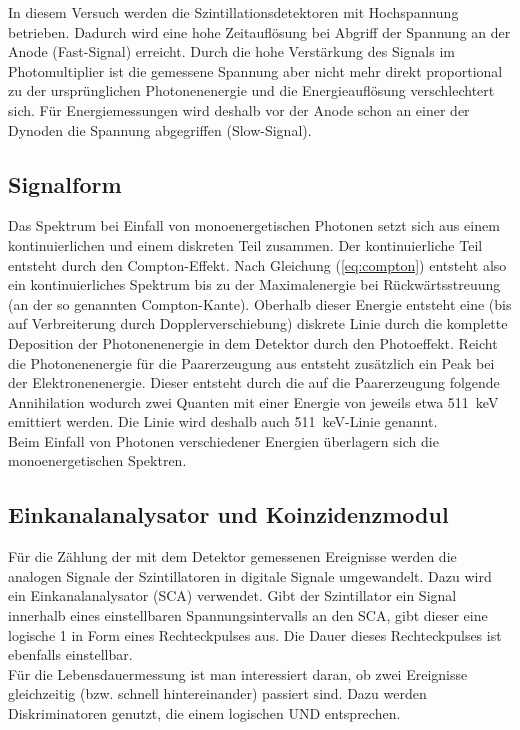 In diesem Versuch werden die Szintillationsdetektoren mit Hochspannung betrieben. Dadurch wird eine hohe Zeitauflösung bei Abgriff der Spannung an der Anode (Fast-Signal) erreicht. Durch die hohe Verstärkung des Signals im Photomultiplier ist die gemessene Spannung aber nicht mehr direkt proportional zu der ursprünglichen Photonenenergie und die Energieauflösung verschlechtert sich. Für Energiemessungen wird deshalb vor der Anode schon an einer der Dynoden die Spannung abgegriffen (Slow-Signal).

\subsection{Signalform}
Das Spektrum bei Einfall von monoenergetischen Photonen setzt sich aus einem kontinuierlichen und einem diskreten Teil zusammen. Der kontinuierliche Teil entsteht durch den Compton-Effekt. Nach Gleichung (\ref{eq:compton}) entsteht also ein kontinuierliches Spektrum bis zu der Maximalenergie bei Rückwärtsstreuung (an der so genannten Compton-Kante). Oberhalb dieser Energie entsteht eine (bis auf Verbreiterung durch Dopplerverschiebung) diskrete Linie durch die komplette Deposition der Photonenenergie in dem Detektor durch den Photoeffekt. Reicht die Photonenenergie für die Paarerzeugung aus entsteht zusätzlich ein Peak bei der Elektronenenergie. Dieser entsteht durch die auf die Paarerzeugung folgende Annihilation wodurch zwei Quanten mit einer Energie von jeweils etwa \SI{511}{\kilo\electronvolt} emittiert werden. Die Linie wird deshalb auch \SI{511}{\kilo\electronvolt}-Linie genannt. \\

Beim Einfall von Photonen verschiedener Energien überlagern sich die monoenergetischen Spektren.

\subsection{Einkanalanalysator und Koinzidenzmodul}
Für die Zählung der mit dem Detektor gemessenen Ereignisse werden die analogen Signale der Szintillatoren in digitale Signale umgewandelt. Dazu wird ein Einkanalanalysator (SCA) verwendet. Gibt der Szintillator ein Signal innerhalb eines einstellbaren Spannungsintervalls an den SCA, gibt dieser eine logische 1 in Form eines Rechteckpulses aus. Die Dauer dieses Rechteckpulses ist ebenfalls einstellbar.\\

Für die Lebensdauermessung ist man interessiert daran, ob zwei Ereignisse gleichzeitig (bzw. schnell hintereinander) passiert sind. Dazu werden Diskriminatoren genutzt, die einem logischen UND entsprechen.

